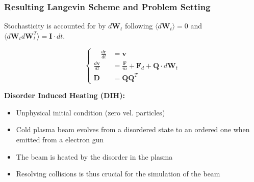 \documentclass[.08pt,aspectratio=169,t]{beamer}
\begin{document}
\begin{frame}
    \frametitle{Resulting Langevin Scheme and Problem Setting}
Stochasticity is accounted for by  $d\bm W_t$ following $\langle d\bm W_t \rangle = 0$ and $\langle d\bm W_t d\bm W_t^T \rangle = \bm I \cdot dt$.

\begin{equation}
\left\{
 \begin{align}
	 \quad \frac{d \bm r}{dt} &= \bm v \\
	 \frac{d \bm v}{dt}  &=  \frac{\bm F}{m} + \bm F_d + \bm Q \cdot d\bm W_t \\
	 \bm D &= \bm Q \bm Q^T
 \end{align}	
\right.
\end{equation}

\vspace{3mm}

\begin{large}
    \textbf{Disorder Induced Heating (DIH):}
\end{large}

\vspace{2.5mm}

\begin{itemize}[label=$\bullet$]
     \setlength{\itemsep}{3mm}
     \item Unphysical initial condition (zero vel. particles)
     \item Cold plasma beam evolves from a disordered state to an ordered one when emitted from a electron gun
    \item The beam is heated by the disorder in the plasma
    \item Resolving collisions is thus crucial for the simulation of the beam
 \end{itemize}

\end{frame}
\end{document}
